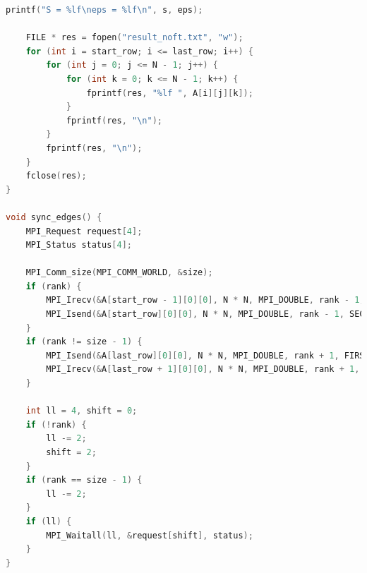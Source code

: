 \documentclass[a4paper]{article}
\begin{document}
\begin{lstlisting}[caption=jac\_3d\_mpi\_noft.c, label={lst:3}, language=C]
    printf("S = %lf\neps = %lf\n", s, eps);

    FILE * res = fopen("result_noft.txt", "w");
    for (int i = start_row; i <= last_row; i++) {
        for (int j = 0; j <= N - 1; j++) {
            for (int k = 0; k <= N - 1; k++) {
                fprintf(res, "%lf ", A[i][j][k]);
            }
            fprintf(res, "\n");
        }
        fprintf(res, "\n");
    }
    fclose(res);
}

void sync_edges() {
    MPI_Request request[4];
    MPI_Status status[4];

    MPI_Comm_size(MPI_COMM_WORLD, &size);
    if (rank) {
        MPI_Irecv(&A[start_row - 1][0][0], N * N, MPI_DOUBLE, rank - 1, FIRST_SYNC_TAG, MPI_COMM_WORLD, &request[0]);
        MPI_Isend(&A[start_row][0][0], N * N, MPI_DOUBLE, rank - 1, SECOND_SYNC_TAG, MPI_COMM_WORLD, &request[1]);
    }
    if (rank != size - 1) {
        MPI_Isend(&A[last_row][0][0], N * N, MPI_DOUBLE, rank + 1, FIRST_SYNC_TAG, MPI_COMM_WORLD, &request[2]);
        MPI_Irecv(&A[last_row + 1][0][0], N * N, MPI_DOUBLE, rank + 1, SECOND_SYNC_TAG, MPI_COMM_WORLD, &request[3]);
    }

    int ll = 4, shift = 0;
    if (!rank) {
        ll -= 2;
        shift = 2;
    }
    if (rank == size - 1) {
        ll -= 2;
    }
    if (ll) {
        MPI_Waitall(ll, &request[shift], status);
    }
}

\end{lstlisting}
\end{document}
